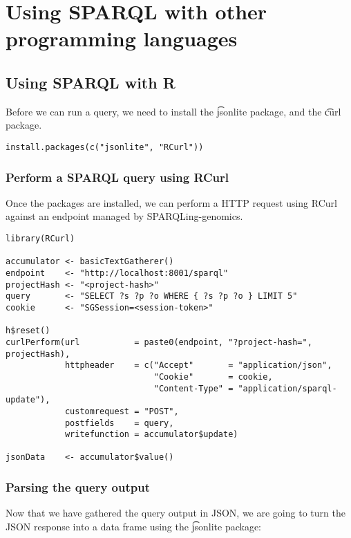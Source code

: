 \chapter{Using SPARQL with other programming languages}
\label{chap:programming}

\section{Using SPARQL with R}

  Before we can run a query, we need to install the \t{jsonlite} package,
  and the \t{curl} package.

\begin{siderules}
\begin{verbatim}
install.packages(c("jsonlite", "RCurl"))
\end{verbatim}
\end{siderules}

\subsection{Perform a SPARQL query using RCurl}

  Once the packages are installed, we can perform a HTTP request using RCurl
  against an endpoint managed by SPARQLing-genomics.

\begin{siderules}
\begin{verbatim}
library(RCurl)

accumulator <- basicTextGatherer()
endpoint    <- "http://localhost:8001/sparql"
projectHash <- "<project-hash>"
query       <- "SELECT ?s ?p ?o WHERE { ?s ?p ?o } LIMIT 5"
cookie      <- "SGSession=<session-token>"

h$reset()
curlPerform(url           = paste0(endpoint, "?project-hash=", projectHash),
            httpheader    = c("Accept"       = "application/json",
                              "Cookie"       = cookie,
                              "Content-Type" = "application/sparql-update"),
            customrequest = "POST",
            postfields    = query,
            writefunction = accumulator$update)

jsonData    <- accumulator$value()
\end{verbatim}
\end{siderules}

\subsection{Parsing the query output}
  Now that we have gathered the query output in JSON, we are going to turn
  the JSON response into a data frame using the \t{jsonlite} package:

